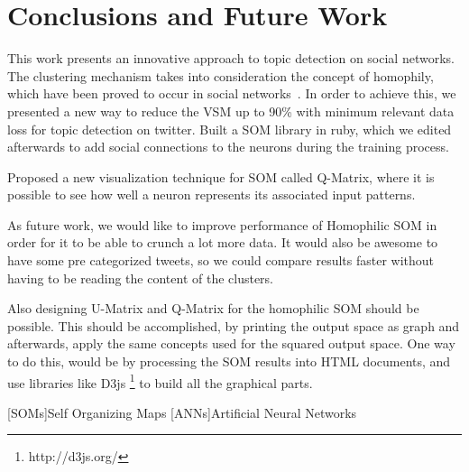 \documentclass[journal]{IEEEtran}
\begin{document}
\section{Conclusions and Future Work}
This work presents an innovative approach to topic detection on social networks. The clustering mechanism takes into consideration the concept of homophily, which have been proved to occur in social  networks~\cite{Wehrens2007}.
In order to achieve this, we presented a new way to reduce the \ac{VSM} up to 90\% with minimum relevant data loss for topic detection on twitter. Built a \ac{SOM} library in ruby,  which we edited afterwards to add social connections to the neurons during the training process.

Proposed a new visualization technique for \ac{SOM} called \ac{Q-Matrix}, where it is possible to see how well a neuron represents its associated input patterns.

As future work, we would like to improve performance of Homophilic \ac{SOM} in order for it to be able to crunch a lot more data. It would also be awesome to have some pre categorized tweets, so we could compare results faster without having to be reading the content of the clusters.

Also designing \ac{U-Matrix} and \ac{Q-Matrix} for the homophilic \ac{SOM} should be possible. This should be accomplished, by printing the output space as graph and afterwards,  apply the same concepts used for the squared output space. One way to do this, would be by processing the \ac{SOM} results into HTML documents, and use libraries like D3js \footnote{http://d3js.org/} to build all the graphical parts. 

               


\begin{acronym}[TDMA]
	[SOMs]{Self Organizing Maps}
	[ANNs]{Artificial Neural Networks}
\end{acronym}
\end{document}
